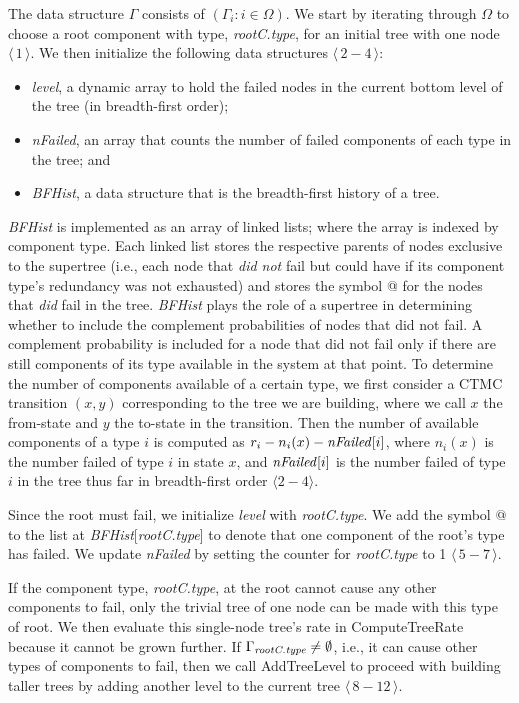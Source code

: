 \documentclass[12pt]{article}
\newcommand{\varName}[1]{\textrm{\it#1}}
\newcommand{\citeLine}[1]{$\langle \, #1 \, \rangle$}
\newcommand{\citeBlock}[2]{$\langle \, #1 - #2 \, \rangle$}
\begin{document}
The data structure $\Gamma$ consists of $(\Gamma_i : i \in \Omega)$. We start by iterating through $\Omega$ to choose a root component with type, \varName{rootC.type}, for an initial tree with one node \citeLine{1}. We then initialize the following data structures \citeBlock{2}{4}: \begin{itemize} \item \varName{level}, a dynamic array to hold the failed nodes in the current bottom level of the tree (in breadth-first order); \item \varName{nFailed}, an array that counts the number of failed components of each type in the tree; and \item \varName{BFHist}, a data structure that is the breadth-first history of a tree. \end{itemize} \varName{BFHist} is implemented as an array of linked lists; where the array is indexed by component type. Each linked list stores the respective parents of nodes exclusive to the supertree (i.e., each node that \textit{did not} fail but could have if its component type's redundancy was not exhausted) and stores the symbol @ for the nodes that \textit{did} fail in the tree. \varName{BFHist} plays the role of a supertree in determining whether to include the complement probabilities of nodes that did not fail. A complement probability is included for a node that did not fail only if there are still components of its type available in the system at that point. To determine the number of components available of a certain type, we first consider a CTMC transition $(x, y)$ corresponding to the tree we are building, where we call $x$ the from-state and $y$ the to-state in the transition. Then the number of available components of a type $i$ is computed as $r_i - n_i(x) - \mbox{\textit{nFailed}}[i]$, where $n_i(x)$ is the number failed of type $i$ in state $x$, and $\mbox{\textit{nFailed}}[i]$ is the number failed of type $i$ in the tree thus far in breadth-first order $\langle 2-4 \rangle$.

Since the root must fail, we initialize \varName{level} with \varName{rootC.type}. We add the symbol @ to the list at \varName{BFHist}[\varName{rootC.type}] to denote that one component of the root's type has failed. We update \varName{nFailed} by setting the counter for \varName{rootC.type} to 1 \citeBlock{5}{7}.

If the component type, \varName{rootC.type}, at the root cannot cause any other components to fail, only the trivial tree of one node can be made with this type of root. We then evaluate this single-node tree's rate in ComputeTreeRate because it cannot be grown further. If $\Gamma_{\varName{rootC.type}} \neq \emptyset$, i.e., it can cause other types of components to fail, then we call AddTreeLevel to proceed with building taller trees by adding another level to the current tree \citeBlock{8}{12}.
\end{document}
